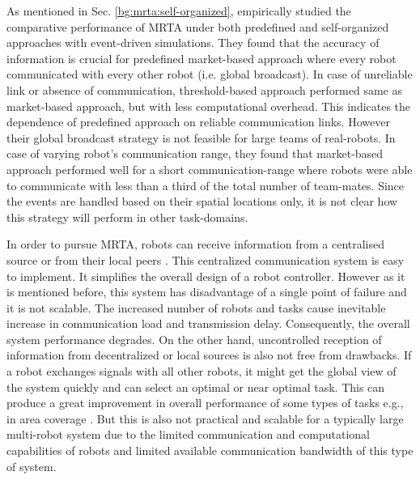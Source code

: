 As mentioned in Sec. \ref{bg:mrta:self-organized},  empirically studied the comparative performance of MRTA under both predefined and self-organized approaches with event-driven simulations. They found that the accuracy of information is crucial for predefined market-based approach where every robot communicated with every other robot (i.e. global broadcast). In case of unreliable link or absence of communication, threshold-based approach performed same as market-based approach, but with less computational overhead. This indicates the dependence of predefined approach on reliable communication links. However their global broadcast strategy is not feasible for large teams of real-robots. In case of varying robot's communication range,  they found that market-based approach performed well for a short communication-range where robots were able to communicate with less than a third of the total number of team-mates. Since the events are handled based on their spatial locations only, it is not clear how this strategy  will perform in other task-domains.  
  
In order to pursue MRTA, robots can receive information from a centralised source \cite{Krieger+2000} or from their local peers \cite{Agassounon+2002}. This centralized communication system is easy to implement. It simplifies the overall design of a robot controller. However as it is  mentioned before, this system has disadvantage of a single point of failure and it is not scalable. The increased number of robots and tasks cause inevitable increase in communication load and transmission delay. Consequently, the overall system performance degrades. On the other hand, uncontrolled reception of information from decentralized or local sources is also not free from drawbacks. If a robot exchanges signals with all other robots, it might get the global view of the system quickly and can select an optimal or near optimal task. This can produce a great improvement in overall performance of some types of tasks e.g., in area coverage \cite{Rutishauser+2009}. But this is also not practical and scalable for a typically large multi-robot system due to the limited communication and computational capabilities of robots and limited available communication bandwidth of this type of system.

